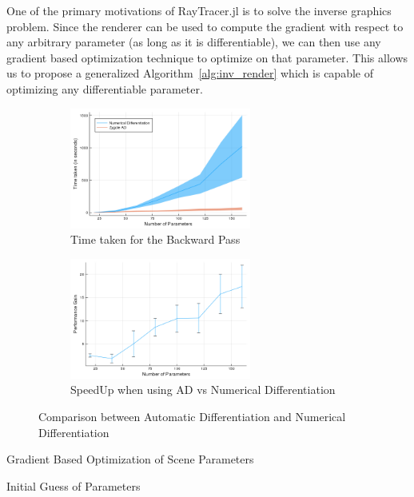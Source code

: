\documentclass{juliacon}
\begin{document}
One of the primary motivations of RayTracer.jl is to solve the inverse graphics problem. Since the renderer can be used to compute the gradient with respect to any arbitrary parameter (as long as it is differentiable), we can then use any gradient based optimization technique to optimize on that parameter. This allows us to propose a generalized Algorithm~\ref{alg:inv_render} which is capable of optimizing any differentiable parameter.

\begin{figure}
    \centering
    \begin{subfigure}[c]{0.48\textwidth}
        \includegraphics[width=\linewidth, height=150px]{images/differentiation.png}
        \caption{Time taken for the Backward Pass}
        \label{fig:ad_perf}
    \end{subfigure}
    \hfill
    \begin{subfigure}[c]{0.48\textwidth}
        \includegraphics[width=\linewidth, height=150px]{images/performance_gain_error.png}
        \caption{SpeedUp when using AD vs Numerical Differentiation}
        \label{fig:ad_perf_err}
    \end{subfigure}
    \caption{Comparison between Automatic Differentiation and Numerical Differentiation}
    \label{fig:ad_better}
\end{figure}

\begin{algorithm}[!htb]
    \caption{Gradient Based Optimization of Scene Parameters}
    \label{alg:inv_render}
    \SetAlgoLined
    Initial Guess of Parameters\;
\end{algorithm}
\end{document}
